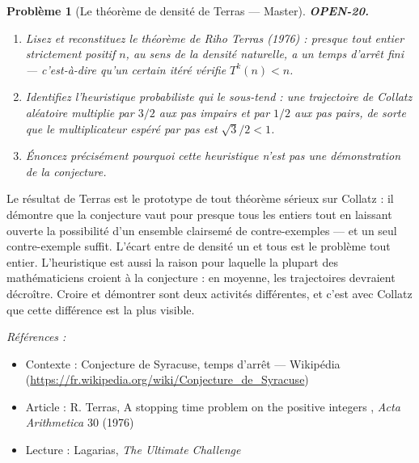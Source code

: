 \documentclass[11pt]{article}
\newtheorem{problem}{Problème}
\newenvironment{refs}{\par\small\noindent\emph{Références :}\begin{itemize}\setlength\itemsep{0pt}}{\end{itemize}\normalsize}
\begin{document}
\bigskip

\begin{problem}[{Le théorème de densité de Terras --- Master}]
\textbf{OPEN-20.} \begin{enumerate}
\item[(a)] Lisez et reconstituez le théorème de Riho Terras (1976) : presque tout entier
strictement positif $ n $, au sens de la densité naturelle, a un temps d'arrêt fini ---
c'est-à-dire qu'un certain itéré vérifie $ T^{k}(n) < n $.
\item[(b)] Identifiez l'heuristique probabiliste qui le sous-tend : une trajectoire de Collatz
\og{} aléatoire \fg{} multiplie par $ 3/2 $ aux pas impairs et par $ 1/2 $ aux pas pairs, de
sorte que le multiplicateur espéré par pas est $ \sqrt{3}/2 < 1 $.
\item[(c)] Énoncez précisément pourquoi cette heuristique n'est \textit{pas} une démonstration de
la conjecture.
\end{enumerate}

\end{problem}

\noindent Le résultat de Terras est le prototype de tout théorème sérieux sur
Collatz : il démontre que la conjecture vaut pour presque tous les entiers tout en
laissant ouverte la possibilité d'un ensemble clairsemé de contre-exemples --- et un seul
contre-exemple suffit. L'écart entre \og{} de densité un \fg{} et \og{} tous \fg{} est le problème tout
entier. L'heuristique est aussi la raison pour laquelle la plupart des mathématiciens
croient à la conjecture : en moyenne, les trajectoires devraient décroître. Croire et
démontrer sont deux activités différentes, et c'est avec Collatz que cette différence est
la plus visible.

\begin{refs}
\item Contexte : Conjecture de Syracuse, temps d'arrêt --- Wikipédia (\url{https://fr.wikipedia.org/wiki/Conjecture_de_Syracuse})
\item Article : R. Terras, \og{} A stopping time problem on the positive integers \fg{}, \textit{Acta Arithmetica} 30 (1976)
\item Lecture : Lagarias, \textit{The Ultimate Challenge}
\end{refs}

\bigskip
\end{document}
